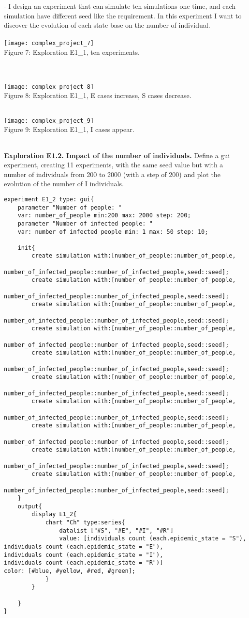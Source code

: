 \documentclass{article}
\begin{document}
- I design an experiment that can simulate ten simulations one time, and each simulation have different seed like the requirement. In this experiment I want to discover the evolution of each state base on the number of individual.
\\\\
\texttt{[image: complex\_project\_7]}
\\
\caption{Figure 7: Exploration E1\_1, ten experiments.}
\\\\
\texttt{[image: complex\_project\_8]}
\\
\caption{Figure 8: Exploration E1\_1, E cases increase, S cases decrease.}
\\
\texttt{[image: complex\_project\_9]}
\\
\caption{Figure 9: Exploration E1\_1, I cases appear.}
\\
\textbf{Exploration E1.2. Impact of the number of individuals.}
Define a gui experiment, creating 11 experiments, with the same seed value but with a number of individuals from 200 to 2000 (with a step of 200) and plot the evolution of the number of I individuals.
\begin{lstlisting}
experiment E1_2 type: gui{
	parameter "Number of people: " 
	var: number_of_people min:200 max: 2000 step: 200;
	parameter "Number of infected people: " 
	var: number_of_infected_people min: 1 max: 50 step: 10;
	
	init{
		create simulation with:[number_of_people::number_of_people,
		number_of_infected_people::number_of_infected_people,seed::seed];
		create simulation with:[number_of_people::number_of_people,
		number_of_infected_people::number_of_infected_people,seed::seed];
		create simulation with:[number_of_people::number_of_people,
		number_of_infected_people::number_of_infected_people,seed::seed];
		create simulation with:[number_of_people::number_of_people,
		number_of_infected_people::number_of_infected_people,seed::seed];
		create simulation with:[number_of_people::number_of_people,
		number_of_infected_people::number_of_infected_people,seed::seed];
		create simulation with:[number_of_people::number_of_people,
		number_of_infected_people::number_of_infected_people,seed::seed];
		create simulation with:[number_of_people::number_of_people,
		number_of_infected_people::number_of_infected_people,seed::seed];
		create simulation with:[number_of_people::number_of_people,
		number_of_infected_people::number_of_infected_people,seed::seed];
		create simulation with:[number_of_people::number_of_people,
		number_of_infected_people::number_of_infected_people,seed::seed];
		create simulation with:[number_of_people::number_of_people,
		number_of_infected_people::number_of_infected_people,seed::seed];
	}
	output{
		display E1_2{
			chart "Ch" type:series{
				datalist ["#S", "#E", "#I", "#R"] 
				value: [individuals count (each.epidemic_state = "S"), 					individuals count (each.epidemic_state = "E"),  					individuals count (each.epidemic_state = "I"), 				individuals count (each.epidemic_state = "R")] 		  					color: [#blue, #yellow, #red, #green];
			}
		}
		
	}
}
\end{lstlisting}
\end{document}
